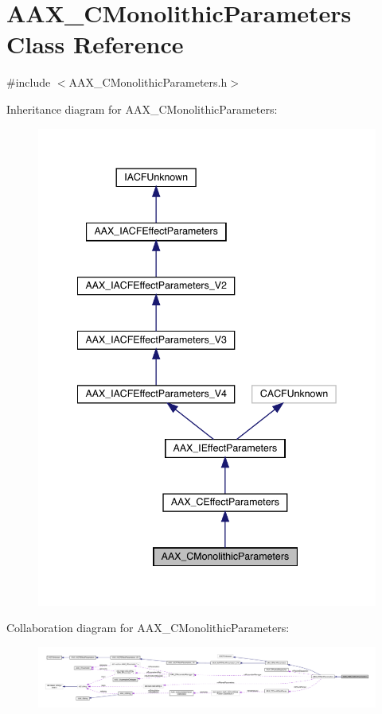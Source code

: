 \hypertarget{a01969}{}\section{A\+A\+X\+\_\+\+C\+Monolithic\+Parameters Class Reference}
\label{a01969}


{\ttfamily \#include $<$A\+A\+X\+\_\+\+C\+Monolithic\+Parameters.\+h$>$}



Inheritance diagram for A\+A\+X\+\_\+\+C\+Monolithic\+Parameters\+:
\nopagebreak
\begin{figure}[H]
\begin{center}
\leavevmode
\includegraphics[width=342pt]{a01968}
\end{center}
\end{figure}


Collaboration diagram for A\+A\+X\+\_\+\+C\+Monolithic\+Parameters\+:
\nopagebreak
\begin{figure}[H]
\begin{center}
\leavevmode
\includegraphics[width=350pt]{a01967}
\end{center}
\end{figure}


